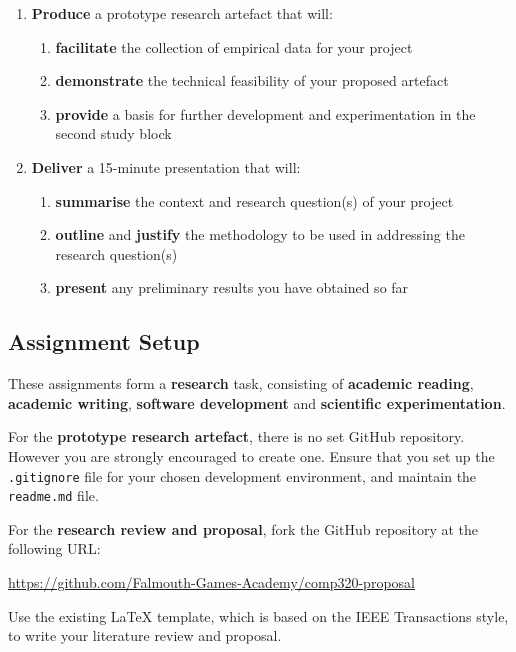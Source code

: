 \begin{enumerate}[label=(\Alph*)]
\begin{enumerate}[label=(\roman*)]
		\end{enumerate}
	\item \textbf{Produce} a prototype research artefact that will:
		\begin{enumerate}[label=(\roman*)]
			\item \textbf{facilitate} the collection of empirical data for your project
			\item \textbf{demonstrate} the technical feasibility of your proposed artefact
			\item \textbf{provide} a basis for further development and
				experimentation in the second study block
		\end{enumerate}
	\item \textbf{Deliver} a 15-minute presentation that will:
		\begin{enumerate}[label=(\roman*)]
			\item \textbf{summarise} the context and research question(s)
				of your project
			\item \textbf{outline} and \textbf{justify} the methodology to be used in
				addressing the research question(s)
			\item \textbf{present} any preliminary results you have obtained so far
		\end{enumerate}
\end{enumerate}

\subsection*{Assignment Setup}

These assignments form a \textbf{research} task, consisting of \textbf{academic reading}, \textbf{academic writing},
\textbf{software development} and \textbf{scientific experimentation}.

For the \textbf{prototype research artefact}, there is no set GitHub repository.
However you are strongly encouraged to create one.
Ensure that you set up the \texttt{.gitignore} file for your chosen development environment,
and maintain the \texttt{readme.md} file.

For the \textbf{research review and proposal}, fork the GitHub repository at the following URL:

\indent \url{https://github.com/Falmouth-Games-Academy/comp320-proposal}

Use the existing LaTeX template, which is based on the IEEE Transactions style,
to write your literature review and proposal.

